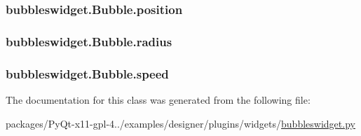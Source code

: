\subsubsection[{position}]{\setlength{\rightskip}{0pt plus 5cm}bubbleswidget.\+Bubble.\+position}\label{classbubbleswidget_1_1Bubble_a40c35e5a4e23023b1687ec1e9718c115}
\hypertarget{classbubbleswidget_1_1Bubble_a4ec512884f4f49de140fdf72efe6fc15}{}
\subsubsection[{radius}]{\setlength{\rightskip}{0pt plus 5cm}bubbleswidget.\+Bubble.\+radius}\label{classbubbleswidget_1_1Bubble_a4ec512884f4f49de140fdf72efe6fc15}
\hypertarget{classbubbleswidget_1_1Bubble_a28beb99c59e243b9c78fc7ab1de2f2b0}{}
\subsubsection[{speed}]{\setlength{\rightskip}{0pt plus 5cm}bubbleswidget.\+Bubble.\+speed}\label{classbubbleswidget_1_1Bubble_a28beb99c59e243b9c78fc7ab1de2f2b0}


The documentation for this class was generated from the following file\+:\begin{DoxyCompactItemize}
\item 
packages/\+Py\+Qt-\/x11-\/gpl-\/4../examples/designer/plugins/widgets/\hyperlink{bubbleswidget_8py}{bubbleswidget.\+py}\end{DoxyCompactItemize}
